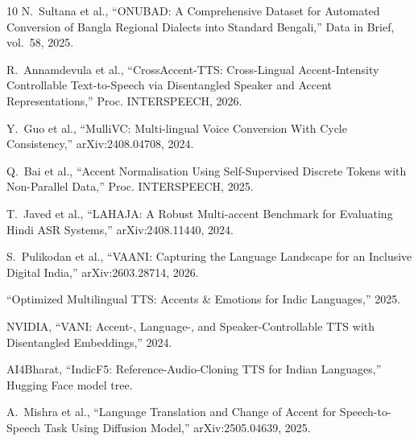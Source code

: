 \documentclass[11pt]{article}
\begin{document}
\begin{thebibliography}{10}
N.~Sultana et al., ``ONUBAD: A Comprehensive Dataset for Automated Conversion of Bangla Regional Dialects into Standard Bengali,'' Data in Brief, vol.~58, 2025.

R.~Annamdevula et al., ``CrossAccent-TTS: Cross-Lingual Accent-Intensity Controllable Text-to-Speech via Disentangled Speaker and Accent Representations,'' Proc. INTERSPEECH, 2026.

Y.~Guo et al., ``MulliVC: Multi-lingual Voice Conversion With Cycle Consistency,'' arXiv:2408.04708, 2024.

Q.~Bai et al., ``Accent Normalisation Using Self-Supervised Discrete Tokens with Non-Parallel Data,'' Proc. INTERSPEECH, 2025.

T.~Javed et al., ``LAHAJA: A Robust Multi-accent Benchmark for Evaluating Hindi ASR Systems,'' arXiv:2408.11440, 2024.

S.~Pulikodan et al., ``VAANI: Capturing the Language Landscape for an Inclusive Digital India,'' arXiv:2603.28714, 2026.

``Optimized Multilingual TTS: Accents \& Emotions for Indic Languages,'' 2025.

NVIDIA, ``VANI: Accent-, Language-, and Speaker-Controllable TTS with Disentangled Embeddings,'' 2024.

AI4Bharat, ``IndicF5: Reference-Audio-Cloning TTS for Indian Languages,'' Hugging Face model tree.

A.~Mishra et al., ``Language Translation and Change of Accent for Speech-to-Speech Task Using Diffusion Model,'' arXiv:2505.04639, 2025.

\end{thebibliography}
\end{document}
